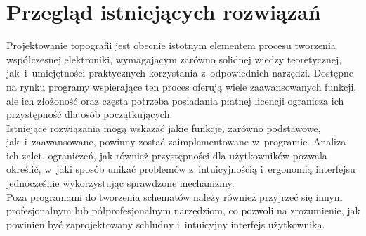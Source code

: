 \chapter{Przegląd istniejących rozwiązań}
\label{ch:przeglad_istniejacych_rozwiazan}

Projektowanie topografii jest obecnie istotnym elementem procesu tworzenia współczesnej elektroniki,
wymagającym zarówno solidnej wiedzy teoretycznej,\linebreak
jak~i~umiejętności praktycznych korzystania z~odpowiednich narzędzi.
Dostępne na rynku programy wspierające ten proces oferują wiele zaawansowanych funkcji,
ale ich złożoność oraz częsta potrzeba posiadania płatnej licencji ogranicza ich przystępność dla osób początkujących.\\
\indent Istniejące rozwiązania mogą wskazać jakie funkcje, zarówno podstawowe, jak~i~zaawansowane,
powinny zostać zaimplementowane w~programie.
Analiza ich zalet, ograniczeń, jak również przystępności dla użytkowników pozwala określić,
w~jaki sposób unikać problemów z~intuicyjnością i~ergonomią interfejsu jednocześnie wykorzystując sprawdzone mechanizmy.\\
\indent Poza programami do tworzenia schematów należy również przyjrzeć się innym profesjonalnym lub półprofesjonalnym narzędziom,
co pozwoli na zrozumienie,
jak powinien być zaprojektowany schludny i~intuicyjny interfejs użytkownika.





